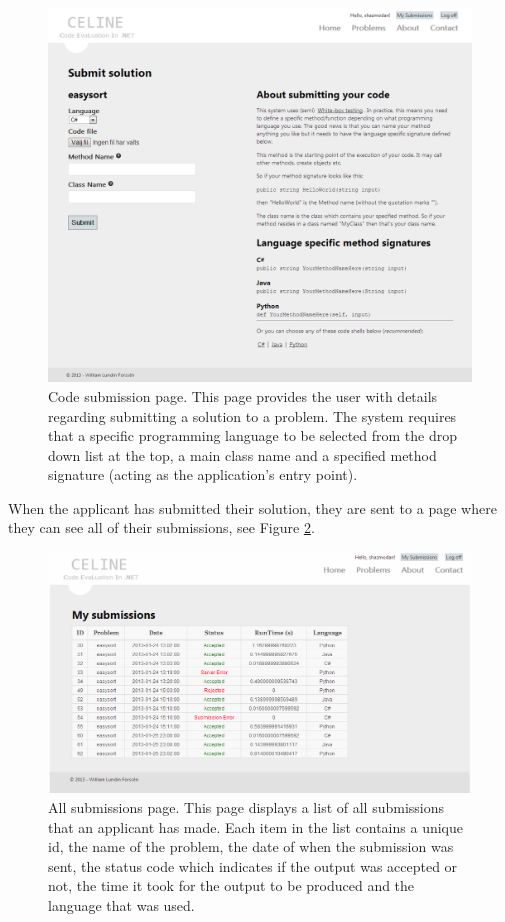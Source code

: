 \begin{figure}[h]
	\centering
	\includegraphics[width=1.0\textwidth]{chapters/media/celine_submit.png}
	\caption{Code submission page. This page provides the user with details regarding submitting a solution to a problem. The system requires that a specific programming language to be selected from the drop down list at the top, a main class name and a specified method signature (acting as the application's entry point).}
	\label{fig:celine_submit}
\end{figure}

When the applicant has submitted their solution, they are sent to a page where they can see all of their submissions, see Figure \ref{fig:celine_submissions}.

\begin{figure}[h]
	\centering
	\includegraphics[width=1.0\textwidth]{chapters/media/celine_submissionsCut.png}
	\caption{All submissions page. This page displays a list of all submissions that an applicant has made. Each item in the list contains a unique id, the name of the problem, the date of when the submission was sent, the status code which indicates if the output was accepted or not, the time it took for the output to be produced and the language that was used.}
	\label{fig:celine_submissions}
\end{figure}


